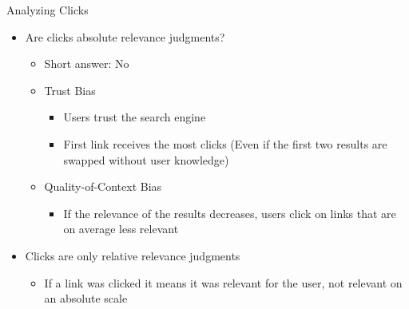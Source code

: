 
\begin{frame}{Analyzing Clicks}
  \begin{itemize}
  \item Are clicks absolute relevance judgments?
    \begin{itemize}
    \item Short answer: No
    \item Trust Bias
      \begin{itemize}
      \item Users trust the search engine
      \item First link receives the most clicks
        (Even if the first two results are swapped without user knowledge)
      \end{itemize}
    \item Quality-of-Context Bias
      \begin{itemize}
      \item If the relevance of the results decreases, users click on links
        that are on average less relevant
      \end{itemize}
    \end{itemize}
  \item Clicks are only relative relevance judgments
    \begin{itemize}
    \item If a link was clicked it means it was relevant for the user,
      not relevant on an absolute scale
    \end{itemize}
  \end{itemize}
\end{frame}


